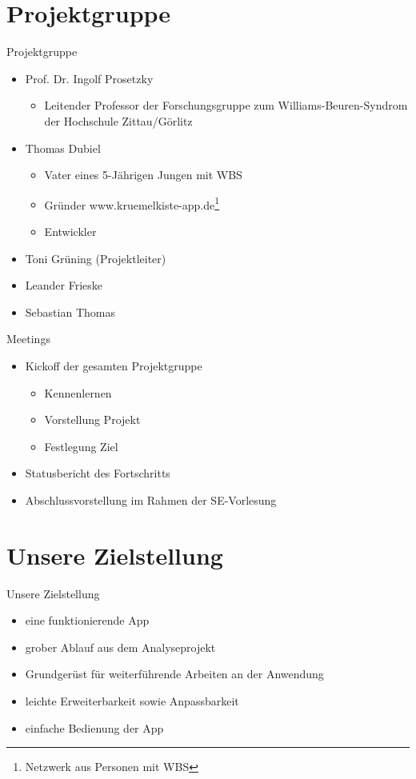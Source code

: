 \documentclass[10pt,fleqn]{beamer}
\begin{document}
\section{Projektgruppe}
	\begin{frame}[t]{Projektgruppe}
		\begin{itemize}
			\item Prof. Dr. Ingolf Prosetzky
			\begin{itemize}
				\item Leitender Professor der Forschungsgruppe zum Williams-Beuren-Syndrom der Hochschule Zittau/Görlitz
			\end{itemize}
			\item Thomas Dubiel
			\begin{itemize}
				\item Vater eines 5-Jährigen Jungen mit WBS
				\item Gründer www.kruemelkiste-app.de\footnote{Netzwerk aus Personen mit WBS}
				\item Entwickler
			\end{itemize}
			\item Toni Grüning (Projektleiter)
			\item Leander Frieske
			\item Sebastian Thomas
		\end{itemize}
	\end{frame}

	\begin{frame}[t]{Meetings}
		\begin{itemize}
			\item Kickoff der gesamten Projektgruppe
			\begin{itemize}
				\item Kennenlernen
				\item Vorstellung Projekt
				\item Festlegung Ziel
			\end{itemize}
			\item Statusbericht des Fortschritts
			\item Abschlussvorstellung im Rahmen der SE-Vorlesung 
		\end{itemize}
	\end{frame}



\section{Unsere Zielstellung}
\begin{frame}[t]{Unsere Zielstellung}
	\begin{itemize}
		\item eine funktionierende App
		\item grober Ablauf aus dem Analyseprojekt
		\item Grundgerüst für weiterführende Arbeiten an der Anwendung
		\item leichte Erweiterbarkeit sowie Anpassbarkeit
		\item einfache Bedienung der App
	\end{itemize}
\end{frame}
\end{document}
